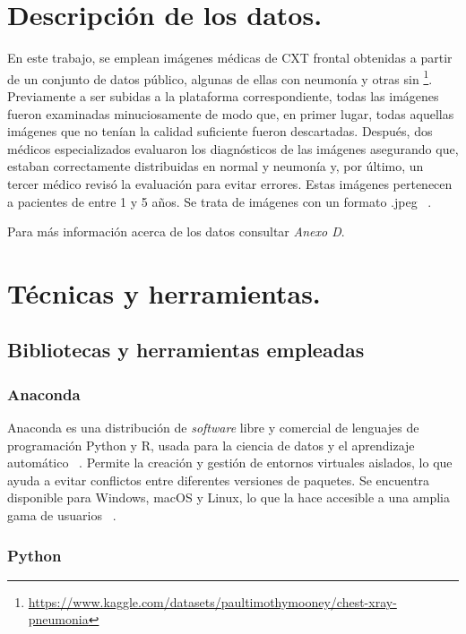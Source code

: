 
\section{Descripción de los datos.}

En este trabajo, se emplean imágenes médicas de CXT frontal obtenidas a partir de un conjunto de datos público, algunas de ellas con neumonía y otras sin \footnote{\url{https://www.kaggle.com/datasets/paultimothymooney/chest-xray-pneumonia}}. Previamente a ser subidas a la plataforma correspondiente, todas las imágenes fueron examinadas minuciosamente de modo que, en primer lugar, todas aquellas imágenes que no tenían la calidad suficiente fueron descartadas. Después, dos médicos especializados evaluaron los diagnósticos de las imágenes asegurando que, estaban correctamente distribuidas en normal y neumonía y, por último, un tercer médico revisó la evaluación para evitar errores. Estas imágenes pertenecen a pacientes de entre 1 y 5 años. Se trata de imágenes con un formato .jpeg ~\cite{kaggle24}.

Para más información acerca de los datos consultar \textit{Anexo D}.
 
\section{Técnicas y herramientas.}

\subsection{Bibliotecas y herramientas empleadas}

\subsubsection{Anaconda}

Anaconda es una distribución de \textit{software} libre y comercial de lenguajes de programación Python y R, usada para la ciencia de datos y el aprendizaje automático ~\cite{wikianaconda24}. Permite la creación y gestión de entornos virtuales aislados, lo que ayuda a evitar conflictos entre diferentes versiones de paquetes. Se encuentra disponible para Windows, macOS y Linux, lo que la hace accesible a una amplia gama de usuarios ~\cite{anaconda24}.

\subsubsection{Python}

